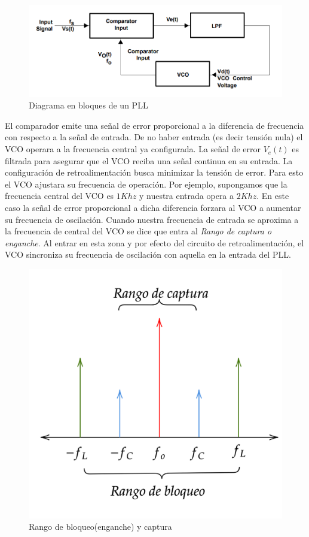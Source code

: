	\begin{figure}[H]
		\includegraphics[width=\linewidth]{ImagenesVarias/PLLblockDiagram.PNG}
		\caption{Diagrama en bloques de un PLL}
	\end{figure}
El comparador emite una señal de error proporcional a la diferencia de frecuencia con respecto a la señal de entrada. De no haber entrada (es decir tensión nula) el VCO operara a la frecuencia central ya configurada. La señal de error $V_e(t)$ es filtrada para asegurar que el VCO reciba una señal continua en su entrada. La configuración de retroalimentación busca minimizar la tensión de error. Para esto el VCO ajustara su frecuencia de operación. Por ejemplo, supongamos que la frecuencia central del VCO es $1Khz$ y nuestra entrada opera a $2Khz$. En este caso la señal de error proporcional a dicha diferencia forzara al VCO a aumentar su frecuencia de oscilación. Cuando nuestra frecuencia de entrada se aproxima a la frecuencia de central del VCO se dice que entra al \emph{Rango de captura o enganche}. Al entrar en esta zona y por efecto del circuito de retroalimentación, el VCO sincroniza su frecuencia de oscilación con aquella en la entrada del PLL.


\begin{figure}[H]
	\centering
	\includegraphics[scale=0.3]{ImagenesVarias/PLL_range2.png}
	\caption{Rango de bloqueo(enganche) y captura}
	\label{blockLockRange}
\end{figure}

